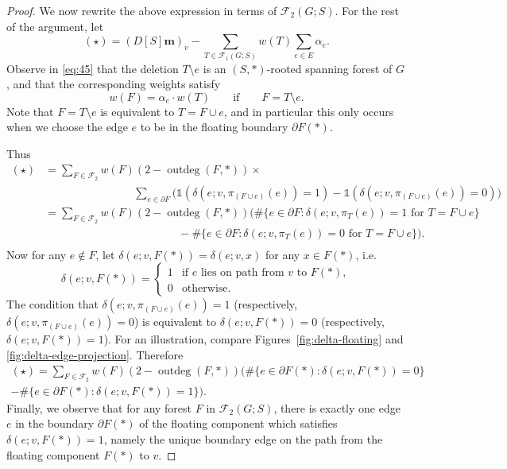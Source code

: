 \documentclass[12pt]{amsart}
\theoremstyle{definition}
\newcommand{\one}{\mathds{1}}
\newcommand{\boldm}{\mathbf{m}}
\newcommand{\trees}{\mathcal{F}_1}
\newcommand{\forests}{\mathcal{F}}
\DeclareMathOperator{\outdeg}{outdeg}
\begin{document}
\begin{proof}
We now rewrite the above expression in terms of $\forests_2(G;S)$.
For the rest of the argument, let
\[
	(\star) = (D[S] \boldm)_v - \sum_{T \in \trees(G;S)} w({T}) \sum_{e \in E} \alpha_e.
\]
Observe in \eqref{eq:45} that the deletion $T \setminus e$ is an $(S,*)$-rooted spanning forest of $G$, and that the corresponding weights satisfy
\[
	w({F}) = \alpha_e \cdot w({T}) \qquad\text{if}\qquad F = T \setminus e.
\]
Note that $F = T \setminus e$ is equivalent to $T = F \cup e$, and in particular this only occurs when we choose the edge $e$ to be in the floating boundary $\partial F(*)$.

Thus
\begin{align*}
	(\star) 
	&= \sum_{F \in \forests_2} w({F}) (2 - \outdeg(F, *)) \times \\
	& \qquad \qquad \qquad \qquad   \sum_{e \in \partial F} \Big( \one(\delta(e; v, \pi_{(F \cup e)}(e)) = 1) - \one(\delta(e; v, \pi_{(F \cup e)}(e)) = 0) \Big) \\
	&= \sum_{F \in \forests_2} w({F}) (2 - \outdeg(F,*)) \Bigg( \#\{e \in \partial F \colon \delta(e; v, \pi_T(e)) = 1 \text{ for } T = F \cup e \} \\
	&\qquad\qquad\qquad\qquad\qquad\qquad - \#\{e \in \partial F \colon \delta(e; v, \pi_T(e)) = 0 \text{ for } T = F \cup e\} \Bigg). \\
\end{align*}
Now for any $e \not\in F$, let $\delta(e; v, F(*)) = \delta(e; v, x)$ for any $x \in F(*)$, i.e.
\[
	\delta(e; v, F(*)) = \begin{cases}
	1 &\text{if $e$ lies on path from $v$ to $F(*)$}, \\
	0 &\text{otherwise}.
	\end{cases}
\]
The condition that $\delta(e; v, \pi_{(F \cup e)}(e)) = 1$ (respectively, $\delta(e; v, \pi_{(F \cup e)}(e)) = 0$)
is equivalent to ${\delta(e; v, F(*)) = 0}$ (respectively, ${\delta(e; v, F(*)) = 1}$).
For an illustration, compare Figures~\ref{fig:delta-floating} and \ref{fig:delta-edge-projection}.
Therefore
\begin{multline}
	(\star) = \sum_{F \in \forests_2} w({F}) (2 - \outdeg(F,*))  \Bigg( \#\{e \in \partial F(*) \colon \delta(e; v, F(*)) = 0 \}  \\
	- \#\{e \in \partial F(*) \colon \delta(e; v, F(*)) = 1 \}  \Bigg).
\end{multline}
Finally, we observe that for any forest $F$ in $\forests_2(G;S)$,
there is exactly one edge $e$ in the boundary $\partial F(*)$ of the floating component which satisfies $\delta(e; v, F(*)) = 1$, namely the unique boundary edge on the path from the floating component $F(*)$ to $v$.

\end{proof}
\end{document}
